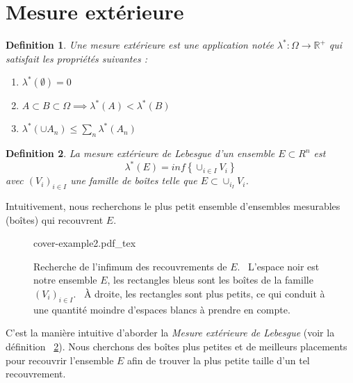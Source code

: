 \documentclass[a4paper]{article}
\newcommand{\incfig}[1]{%
    \def\svgwidth{\columnwidth}
    {#1.pdf_tex}
}
\newcommand{\R}{\mathbb{R}}
\newtheorem{definition}{Definition}[section]
\begin{document}
\section{Mesure extérieure}%
% 
\label{sec:Outer measure}%
\begin{definition}
    Une mesure extérieure est une application notée $\lambda^*: \Omega \to \R^+$ qui satisfait les propriétés suivantes :
    \begin{enumerate}
        \item $\lambda^*(\emptyset) = 0$
        \item $A \subset B \subset \Omega \implies \lambda^*(A) < \lambda^*(B)$ 
        \item $\lambda^*(\cup A_n) \le \sum_n \lambda^*(A_n)$
    \end{enumerate}
\end{definition}%
\begin{definition}\label{defn:lebesgue-outer-measure}
    La mesure extérieure de Lebesgue d'un ensemble $E \subset R^n$ est 
    \[
        \lambda^*(E) = inf \left\{ \cup_{i \in I} V_i \right\}
    \] 
    avec $(V_i)_{i \in I}$ une famille de boîtes telle que $E \subset \cup_{i_I} V_i$.
\end{definition}%
Intuitivement, nous recherchons le plus petit ensemble d'ensembles mesurables (boîtes) qui recouvrent
$E$.%
\begin{figure}[H]
    \centering
    \incfig{cover-example2}
    \caption{Recherche de l'infimum des recouvrements de $E$. \
        L'espace noir est notre
        ensemble $E$, les rectangles bleus sont les boîtes de la famille $(V_i)_{i \in I}$. \
        À droite, les rectangles sont plus petits, ce qui conduit à une quantité moindre d'espaces blancs à prendre en compte.}
    \label{fig:cover-example2}
\end{figure}%
C’est la manière intuitive d’aborder la \textit{Mesure extérieure de Lebesgue} (voir la définition ~\ref{defn:lebesgue-outer-measure}). Nous cherchons des boîtes plus petites et de meilleurs placements pour recouvrir l’ensemble $E$ afin de trouver la plus petite taille d’un tel recouvrement.
\end{document}
